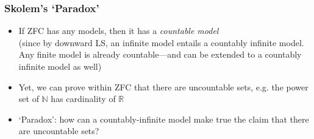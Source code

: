 \begin{frame}
\frametitle{Skolem's `Paradox'}

\begin{itemize}[<+->]



\item If ZFC has any models, then it has a \emph{countable model} \\ (since by downward LS, an infinite model entails a countably infinite model. Any finite model is already countable---and can be extended to a countably infinite model as well)

\item Yet, we can prove within ZFC that there are \textcolor{OGlyallpink}{uncountable sets}, e.g. the power set of $\mathbb{N}$ has cardinality of $\mathbb{R}$

\item `Paradox': how can a \alert{countably-infinite model} make true the claim that there are \textcolor{OGlyallpink}{uncountable sets}? 

\end{itemize}
\end{frame}

